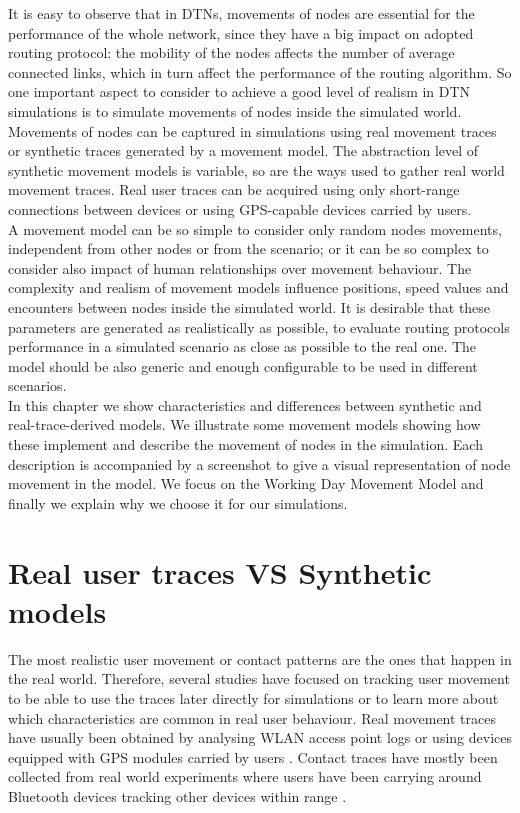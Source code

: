 It is easy to observe that in DTNs, movements of nodes are essential for the performance of the whole network, since they have a big impact on adopted routing protocol: the mobility of the nodes affects the number of average connected links, which in turn affect the performance of the routing algorithm.
So one important aspect to consider to achieve a good level of realism in DTN simulations is to simulate movements of nodes inside the simulated world. 
\\

Movements of nodes can be captured in simulations using real movement traces or synthetic traces generated by a movement model. The abstraction level of synthetic movement models is variable, so are the ways used to gather real world movement traces. Real user traces can be acquired using only short-range connections between devices or using GPS-capable devices carried by users.
\\

A movement model can be so simple to consider only random nodes movements, independent from other nodes or from the scenario; or it can be so complex to consider also impact of human relationships over movement behaviour. The complexity and realism of movement models influence positions, speed values and encounters between nodes inside the simulated world. It is desirable that these parameters are generated as realistically as possible, to evaluate routing protocols performance in a simulated scenario as close as possible to the real one. The model should be also generic and enough configurable to be used in different scenarios.
\\

In this chapter we show characteristics and differences between synthetic and real-trace-derived models. We illustrate some movement models showing how these implement and describe the movement of nodes in the simulation. Each description is accompanied by a screenshot to give a visual representation of node movement in the model. We focus on the Working Day Movement Model and finally we explain why we choose it for our simulations.

\section{Real user traces VS Synthetic models}
The most realistic user movement or contact patterns are the ones that happen in the real world. Therefore, several studies have focused on tracking user movement to be able to use the traces later directly for simulations or to learn more about which characteristics are common in real user behaviour. Real movement traces have usually been obtained by analysing WLAN access point logs \cite{Balachandran:2002:CUB:511399.511359} \cite{Ghosh:2006:PMP:1132983.1132993} \cite{Shaffer:2005:AMM:1104998.1105285} or using devices equipped with GPS modules carried by users \cite{Ashbrook:2002:LSL:862896.881068}. Contact traces have mostly been collected from real world experiments where users have been carrying around Bluetooth devices tracking other devices within range \cite{Natarajan:2007:UUI:1762888.1762904}.
\\

